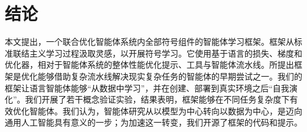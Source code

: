 \section{结论}

本文提出\baby，一个联合优化智能体系统内全部符号组件的智能体学习框架。\baby{}框架从标准联结主义学习过程汲取灵感，以开展符号学习。它使用基于语言的损失、梯度和优化器，相对于智能体系统的整体性能优化提示、工具与智能体流水线。所提出框架是优化能够借助复杂流水线解决现实复杂任务的智能体的早期尝试之一。我们的框架让语言智能体能够“从数据中学习”，并在创建、部署到真实环境之后“自我演化”。我们开展了若干概念验证实验，结果表明，\baby{}框架能够在不同任务复杂度下有效优化智能体。我们认为，智能体研究从以模型为中心转向以数据为中心，是迈向通用人工智能具有意义的一步；为加速这一转变，我们开源了\baby{}框架的代码和提示。
